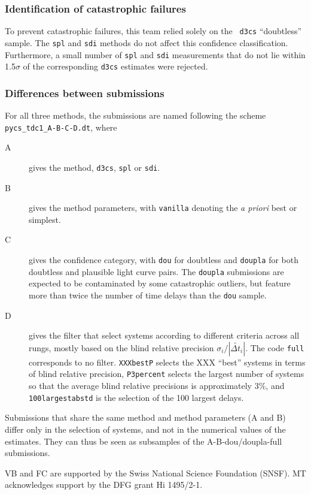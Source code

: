 \documentclass[traditabstract]{aa}
\begin{document}
\subsubsection{Identification of catastrophic failures}

To prevent catastrophic failures, this team relied solely on the {\tt
d3cs} ``doubtless'' sample. The {\tt spl} and {\tt sdi} methods do not
affect this confidence classification. Furthermore, a small number of
{\tt spl} and {\tt sdi} measurements that do not lie within 1.5$\sigma$
of the corresponding {\tt d3cs} estimates were rejected.

\subsubsection{Differences between submissions}

For all three methods, the submissions are named following the
scheme {\tt pycs_tdc1_A-B-C-D.dt}, where
\begin{description}
\item[A] gives the method, {\tt d3cs}, {\tt spl} or {\tt sdi}.
\item[B] gives the method parameters, with {\tt vanilla} denoting the \emph{a priori} best or simplest.
\item[C] gives the confidence category, with {\tt dou} for doubtless and {\tt doupla} for both doubtless and plausible light curve pairs. The {\tt doupla} submissions are expected to be contaminated by some catastrophic outliers, but feature more than twice the number of time delays than the {\tt dou} sample.
\item[D] gives the filter that select systems according to different criteria across all rungs, mostly based on the
blind relative precision $\sigma_i / |\widetilde{\Delta t_i}|$. The code {\tt full} corresponds to no filter. {\tt XXXbestP} selects the XXX ``best'' systems in terms of blind relative precision, {\tt P3percent} selects the largest number of systems so that the average blind relative precisions is approximately 3\%, and {\tt 100largestabstd} is the selection of the 100 largest delays.
\end{description}

Submissions that share the same method and method parameters (A and B) differ only in the selection of systems, and not in the numerical values of the estimates. They can thus be seen as subsamples of the A-B-dou/doupla-full submissions.





\begin{acknowledgements}
VB and FC are supported by the Swiss National Science Foundation (SNSF). MT acknowledges support by the DFG grant Hi 1495/2-1.
\end{acknowledgements}





\end{document}
